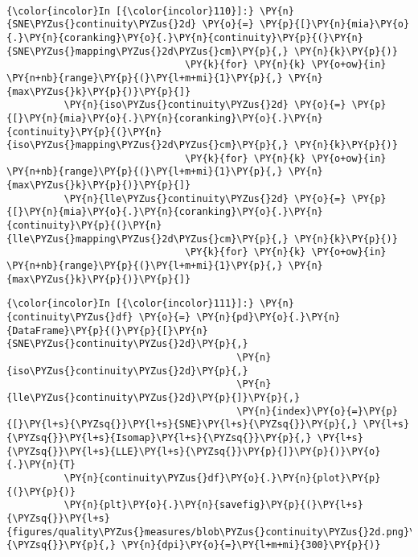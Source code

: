     \begin{center}
    \end{center}
    { \hspace*{\fill} \\}

    \begin{Verbatim}[commandchars=\\\{\}]
{\color{incolor}In [{\color{incolor}110}]:} \PY{n}{SNE\PYZus{}continuity\PYZus{}2d} \PY{o}{=} \PY{p}{[}\PY{n}{mia}\PY{o}{.}\PY{n}{coranking}\PY{o}{.}\PY{n}{continuity}\PY{p}{(}\PY{n}{SNE\PYZus{}mapping\PYZus{}2d\PYZus{}cm}\PY{p}{,} \PY{n}{k}\PY{p}{)}
                               \PY{k}{for} \PY{n}{k} \PY{o+ow}{in} \PY{n+nb}{range}\PY{p}{(}\PY{l+m+mi}{1}\PY{p}{,} \PY{n}{max\PYZus{}k}\PY{p}{)}\PY{p}{]}
          \PY{n}{iso\PYZus{}continuity\PYZus{}2d} \PY{o}{=} \PY{p}{[}\PY{n}{mia}\PY{o}{.}\PY{n}{coranking}\PY{o}{.}\PY{n}{continuity}\PY{p}{(}\PY{n}{iso\PYZus{}mapping\PYZus{}2d\PYZus{}cm}\PY{p}{,} \PY{n}{k}\PY{p}{)}
                               \PY{k}{for} \PY{n}{k} \PY{o+ow}{in} \PY{n+nb}{range}\PY{p}{(}\PY{l+m+mi}{1}\PY{p}{,} \PY{n}{max\PYZus{}k}\PY{p}{)}\PY{p}{]}
          \PY{n}{lle\PYZus{}continuity\PYZus{}2d} \PY{o}{=} \PY{p}{[}\PY{n}{mia}\PY{o}{.}\PY{n}{coranking}\PY{o}{.}\PY{n}{continuity}\PY{p}{(}\PY{n}{lle\PYZus{}mapping\PYZus{}2d\PYZus{}cm}\PY{p}{,} \PY{n}{k}\PY{p}{)}
                               \PY{k}{for} \PY{n}{k} \PY{o+ow}{in} \PY{n+nb}{range}\PY{p}{(}\PY{l+m+mi}{1}\PY{p}{,} \PY{n}{max\PYZus{}k}\PY{p}{)}\PY{p}{]}
\end{Verbatim}

    \begin{Verbatim}[commandchars=\\\{\}]
{\color{incolor}In [{\color{incolor}111}]:} \PY{n}{continuity\PYZus{}df} \PY{o}{=} \PY{n}{pd}\PY{o}{.}\PY{n}{DataFrame}\PY{p}{(}\PY{p}{[}\PY{n}{SNE\PYZus{}continuity\PYZus{}2d}\PY{p}{,}
                                        \PY{n}{iso\PYZus{}continuity\PYZus{}2d}\PY{p}{,}
                                        \PY{n}{lle\PYZus{}continuity\PYZus{}2d}\PY{p}{]}\PY{p}{,}
                                        \PY{n}{index}\PY{o}{=}\PY{p}{[}\PY{l+s}{\PYZsq{}}\PY{l+s}{SNE}\PY{l+s}{\PYZsq{}}\PY{p}{,} \PY{l+s}{\PYZsq{}}\PY{l+s}{Isomap}\PY{l+s}{\PYZsq{}}\PY{p}{,} \PY{l+s}{\PYZsq{}}\PY{l+s}{LLE}\PY{l+s}{\PYZsq{}}\PY{p}{]}\PY{p}{)}\PY{o}{.}\PY{n}{T}
          \PY{n}{continuity\PYZus{}df}\PY{o}{.}\PY{n}{plot}\PY{p}{(}\PY{p}{)}
          \PY{n}{plt}\PY{o}{.}\PY{n}{savefig}\PY{p}{(}\PY{l+s}{\PYZsq{}}\PY{l+s}{figures/quality\PYZus{}measures/blob\PYZus{}continuity\PYZus{}2d.png}\PY{l+s}{\PYZsq{}}\PY{p}{,} \PY{n}{dpi}\PY{o}{=}\PY{l+m+mi}{300}\PY{p}{)}
\end{Verbatim}

